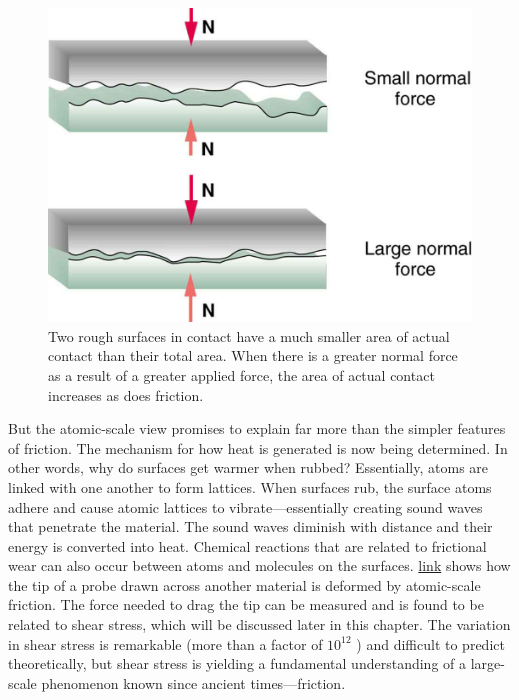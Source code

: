 \documentclass[
]{book}
\begin{document}
\begin{figure}
\hypertarget{import-auto-id1165298530900}{%
\centering
\includegraphics{images/Figure_06_01_04a.jpg}
\caption{Two rough surfaces in contact have a much smaller area of actual
contact than their total area. When there is a greater normal force as a
result of a greater applied force, the area of actual contact increases
as does
friction.}\label{import-auto-id1165298530900}
}
\end{figure}

But the atomic-scale view promises to explain far more than the simpler
features of friction. The mechanism for how heat is generated is now
being determined. In other words, why do surfaces get warmer when
rubbed? Essentially, atoms are linked with one another to form lattices.
When surfaces rub, the surface atoms adhere and cause atomic lattices to
vibrate---essentially creating sound waves that penetrate the material.
The sound waves diminish with distance and their energy is converted
into heat. Chemical reactions that are related to frictional wear can
also occur between atoms and molecules on the surfaces.
\protect\hyperlink{import-auto-id1165298744656}{link} shows how
the tip of a probe drawn across another material is deformed by
atomic-scale friction. The force needed to drag the tip can be measured
and is found to be related to shear stress, which will be discussed
later in this chapter. The variation in shear stress is remarkable (more
than a factor of \(\text{10}^{\text{12}}{}\) ) and difficult to predict
theoretically, but shear stress is yielding a fundamental understanding
of a large-scale phenomenon known since ancient times---friction.
\end{document}
